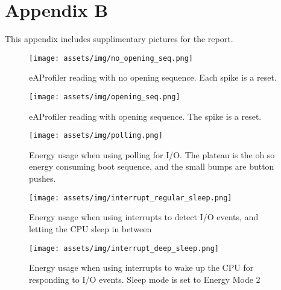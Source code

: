 \section{Appendix B}
\label{appendix:b}

This appendix includes supplimentary pictures for the report.

\begin{figure}[ht!]
    \begin{center}
    \texttt{[image: assets/img/no\_opening\_seq.png]}
    \caption{eAProfiler reading with no opening sequence. Each spike is a reset.}
    \label{fig:no_opening_seq}
    \end{center}
\end{figure}

\begin{figure}[ht!]
    \begin{center}
    \texttt{[image: assets/img/opening\_seq.png]}
    \caption{eAProfiler reading with opening sequence. The spike is a reset.}
    \label{fig:opening_seq}
    \end{center}
\end{figure}

\begin{figure}[ht!]
    \begin{center}
    \texttt{[image: assets/img/polling.png]}
    \caption{Energy usage when using polling for I/O. The plateau is the oh so energy consuming boot sequence, and the small bumps are button pushes.}
    \label{fig:polling_io}
    \end{center}
\end{figure}

\begin{figure}[ht!]
    \begin{center}
    \texttt{[image: assets/img/interrupt\_regular\_sleep.png]}
    \caption{Energy usage when using interrupts to detect I/O events, and letting the CPU sleep in between}
    \label{fig:interrupt_io}
    \end{center}
\end{figure}

\begin{figure}[ht!]
    \begin{center}
    \texttt{[image: assets/img/interrupt\_deep\_sleep.png]}
    \caption{Energy usage when using interrupts to wake up the CPU for responding to I/O events. Sleep mode is set to Energy Mode 2}
    \label{fig:interrupt_io_deep_sleep}
    \end{center}
\end{figure}
